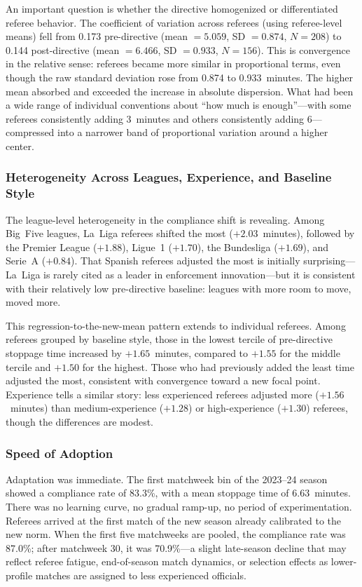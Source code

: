 An important question is whether the directive homogenized or
differentiated referee behavior. The coefficient of variation across
referees (using referee-level means) fell from 0.173 pre-directive
(mean $= 5.059$, SD $= 0.874$, $N = 208$) to 0.144 post-directive
(mean $= 6.466$, SD $= 0.933$, $N = 156$). This is convergence in
the relative sense: referees became more similar in proportional terms,
even though the raw standard deviation rose from 0.874 to
0.933~minutes. The higher mean absorbed and exceeded the increase in
absolute dispersion. What had been a wide range of individual
conventions about ``how much is enough''---with some referees
consistently adding 3~minutes and others consistently adding
6---compressed into a narrower band of proportional variation around
a higher center.

\subsubsection*{Heterogeneity Across Leagues, Experience, and Baseline Style}

The league-level heterogeneity in the compliance shift is revealing.
Among Big~Five leagues, La~Liga referees shifted the most
($+2.03$~minutes), followed by the Premier League ($+1.88$), Ligue~1
($+1.70$), the Bundesliga ($+1.69$), and Serie~A ($+0.84$). That
Spanish referees adjusted the most is initially surprising---La~Liga
is rarely cited as a leader in enforcement innovation---but it is
consistent with their relatively low pre-directive baseline: leagues
with more room to move, moved more.

This regression-to-the-new-mean pattern extends to individual referees.
Among referees grouped by baseline style, those in the lowest tercile
of pre-directive stoppage time increased by $+1.65$~minutes, compared
to $+1.55$ for the middle tercile and $+1.50$ for the highest. Those
who had previously added the least time adjusted the most, consistent
with convergence toward a new focal point. Experience tells a similar
story: less experienced referees adjusted more ($+1.56$~minutes) than
medium-experience ($+1.28$) or high-experience ($+1.30$) referees,
though the differences are modest.

\subsubsection*{Speed of Adoption}

Adaptation was immediate. The first matchweek bin of the 2023--24
season showed a compliance rate of 83.3\%, with a mean stoppage time
of 6.63~minutes. There was no learning curve, no gradual ramp-up, no
period of experimentation. Referees arrived at the first match of the
new season already calibrated to the new norm. When the first five
matchweeks are pooled, the compliance rate was 87.0\%; after matchweek
30, it was 70.9\%---a slight late-season decline that may reflect
referee fatigue, end-of-season match dynamics, or selection effects as
lower-profile matches are assigned to less experienced officials.

